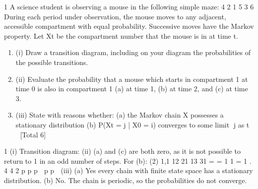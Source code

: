 \documentclass[a4paper,12pt]{article}
\begin{document}
1 A science student is observing a mouse in the following simple maze:
4
2
1 5
3
6
During each period under observation, the mouse moves to any adjacent, accessible
compartment with equal probability. Successive moves have the Markov property.
Let Xt be the compartment number that the mouse is in at time t.
\begin{enumerate}
    \item (i) Draw a transition diagram, including on your diagram the probabilities of the
possible transitions. 
    \item (ii) Evaluate the probability that a mouse which starts in compartment 1 at time 0
is also in compartment 1 (a) at time 1, (b) at time 2, and (c) at time 3. 
    \item (iii) State with reasons whether:
(a) the Markov chain X possesses a stationary distribution
(b) P(Xt = j | X0 = i) converges to some limit j as t   
[Total 6]
\end{enumerate}



1 (i) Transition diagram:
(ii) (a) and (c) are both zero, as it is not possible to return to 1 in an odd number of
steps.
For (b): (2)
1,1 12 21 13 31
= = 1 1 = 1 .
4 4 2
p p p  p p 
(iii) (a) Yes every chain with finite state space has a stationary distribution.
(b) No. The chain is periodic, so the probabilities do not converge.

\end{document}
